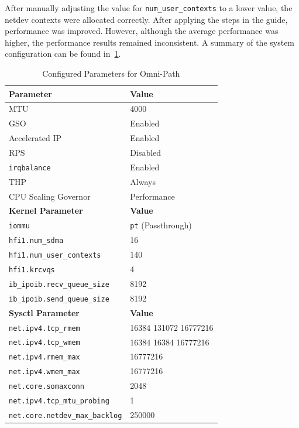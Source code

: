 

After manually adjusting the value for \texttt{num\_user\_contexts} to a lower
value, the netdev contexts were allocated correctly. After applying the steps in
the guide, performance was improved. However, although the average performance
was higher, the performance results remained inconsistent. A summary of the
system configuration can be found in~\cref{tbl:opa-parameters}.

\begin{table}[h]
\centering
\begin{tabular}{ll}
\hline
\textbf{Parameter}                      & \textbf{Value} \\
\hline
\ac{MTU}                                & 4000 \\
\ac{GSO}                                & Enabled \\
Accelerated \ac{IP}                     & Enabled \\
\ac{RPS}                                & Disabled \\
\texttt{irqbalance}                     & Enabled \\
\ac{THP}                                & Always \\
\ac{CPU} Scaling Governor               & Performance \\
\hline
\textbf{Kernel Parameter}               & \textbf{Value} \\
\hline
\texttt{iommu}                          & \texttt{pt} (Passthrough) \\
\texttt{hfi1.num\_sdma}                 & 16 \\
\texttt{hfi1.num\_user\_contexts}       & 140 \\
\texttt{hfi1.krcvqs}                    & 4 \\
\texttt{ib\_ipoib.recv\_queue\_size}    & 8192 \\
\texttt{ib\_ipoib.send\_queue\_size}    & 8192 \\
\hline
\textbf{Sysctl Parameter}               & \textbf{Value} \\
\hline
\texttt{net.ipv4.tcp\_rmem}             & 16384 131072 16777216 \\
\texttt{net.ipv4.tcp\_wmem}             & 16384 16384 16777216 \\
\texttt{net.ipv4.rmem\_max}             & 16777216 \\
\texttt{net.ipv4.wmem\_max}             & 16777216 \\
\texttt{net.core.somaxconn}             & 2048 \\
\texttt{net.ipv4.tcp\_mtu\_probing}     & 1 \\
\texttt{net.core.netdev\_max\_backlog}  & 250000 \\


\hline
\end{tabular}
\caption{Configured Parameters for Omni-Path}
\label{tbl:opa-parameters}
\end{table}

